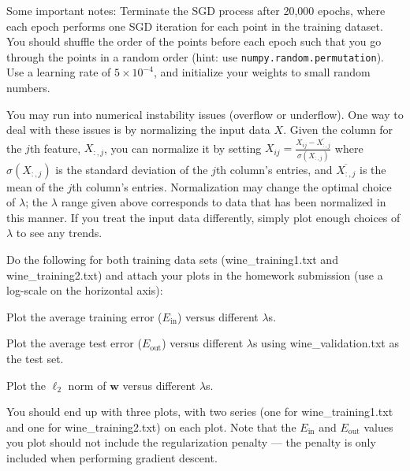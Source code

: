 Some important notes: Terminate the SGD process after 20,000 epochs, where each epoch performs one SGD iteration for each point in the training dataset. You should shuffle the order of the points before each epoch such that you go through the points in a random order (hint: use \texttt{numpy.random.permutation}). Use a learning rate of $5 \times 10^{-4}$, and initialize your weights to small random numbers. 

You may run into numerical instability issues (overflow or underflow). One way to deal with these issues is by normalizing the input data $X$. Given the column for the $j$th feature, $X_{:,j}$, you can normalize it by setting $X_{ij} = \frac{X_{ij} - \overline{X_{:,j}} }{\sigma(X_{:,j})}$ where $\sigma(X_{:,j})$ is the standard deviation of the $j$th column's entries, and $\overline{X_{:,j}}$ is the mean of the $j$th column's entries. Normalization may change the optimal choice of $\lambda$; the $\lambda$ range given above corresponds to data that has been normalized in this manner. If you treat the input data differently, simply plot enough choices of $\lambda$ to see any trends.

\problem[16]
Do the following for both training data sets (wine\_training1.txt and wine\_training2.txt) and attach your plots in the homework submission (use a log-scale on the horizontal axis):

\subproblem Plot the average training error ($E_\text{in}$) versus different $\lambda$s.

\subproblem Plot the average test error ($E_\text{out}$) versus different $\lambda$s using wine\_validation.txt as the test set.

\subproblem Plot the $\ell_2$ norm of $\mathbf{w}$ versus different $\lambda$s. \medskip

 You should end up with three plots, with two series (one for wine\_training1.txt and one for wine\_training2.txt) on each plot. Note that the $E_\text{in}$ and $E_\text{out}$ values you plot should not include the regularization penalty --- the penalty is only included when performing gradient descent.

